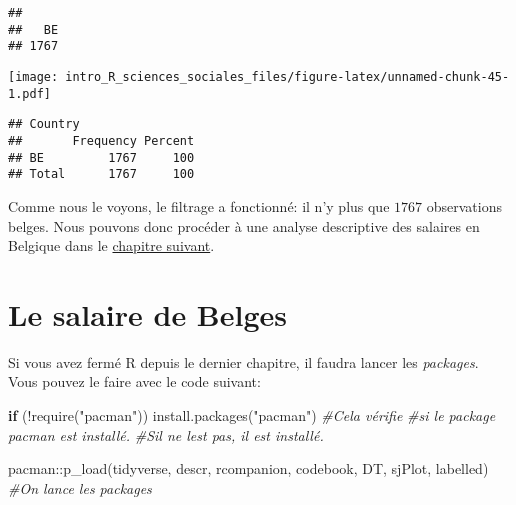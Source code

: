 \documentclass[
]{book}
\newenvironment{Shaded}{\begin{snugshade}}{\end{snugshade}}
\newcommand{\CommentTok}[1]{\textcolor[rgb]{0.56,0.35,0.01}{\textit{#1}}}
\newcommand{\ControlFlowTok}[1]{\textcolor[rgb]{0.13,0.29,0.53}{\textbf{#1}}}
\newcommand{\FunctionTok}[1]{\textcolor[rgb]{0.00,0.00,0.00}{#1}}
\newcommand{\NormalTok}[1]{#1}
\newcommand{\SpecialCharTok}[1]{\textcolor[rgb]{0.00,0.00,0.00}{#1}}
\newcommand{\StringTok}[1]{\textcolor[rgb]{0.31,0.60,0.02}{#1}}
\begin{document}
\begin{verbatim}
## 
##   BE 
## 1767
\end{verbatim}

\begin{Shaded}
\end{Shaded}

\texttt{[image: intro\_R\_sciences\_sociales\_files/figure-latex/unnamed-chunk-45-1.pdf]}

\begin{verbatim}
## Country 
##       Frequency Percent
## BE         1767     100
## Total      1767     100
\end{verbatim}

Comme nous le voyons, le filtrage a fonctionné: il n'y plus que \(1767\) observations belges. Nous pouvons donc procéder à une analyse descriptive des salaires en Belgique dans le \protect\hyperlink{salaire_belge_stat_desc}{chapitre suivant}.

\hypertarget{salaire_belge_stat_desc}{%
\chapter{Le salaire de Belges}\label{salaire_belge_stat_desc}}

Si vous avez fermé R depuis le dernier chapitre, il faudra lancer les \emph{packages}. Vous pouvez le faire avec le code suivant:

\begin{Shaded}
\begin{Highlighting}[]
\ControlFlowTok{if}\NormalTok{ (}\SpecialCharTok{!}\FunctionTok{require}\NormalTok{(}\StringTok{"pacman"}\NormalTok{)) }\FunctionTok{install.packages}\NormalTok{(}\StringTok{"pacman"}\NormalTok{) }\CommentTok{\#Cela vérifie}
                             \CommentTok{\#si le package pacman est installé.}
                             \CommentTok{\#S\textquotesingle{}il ne l\textquotesingle{}est pas, il est installé.}

\NormalTok{pacman}\SpecialCharTok{::}\FunctionTok{p\_load}\NormalTok{(tidyverse, descr, rcompanion, codebook,}
\NormalTok{               DT, sjPlot, labelled) }\CommentTok{\#On lance les packages}
\end{Highlighting}
\end{Shaded}
\end{document}

